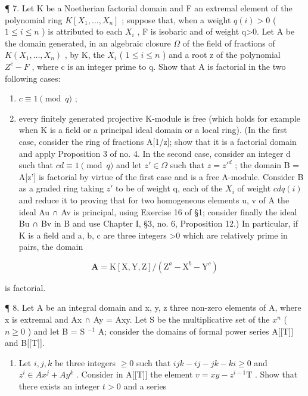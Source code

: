 ¶ 7. Let K be a Noetherian factorial domain and F an extremal element of the polynomial ring \(K[X_{1},\ldots,X_{n}]\) ; suppose that, when a weight \(q(i)>0\) ( \(1\leqslant i\leqslant n\) ) is attributed to each \(X_{i}\) , F is isobaric and of weight q\textgreater0. Let A be the domain generated, in an algebraic closure \(\Omega\) of the field of fractions of \(K(X_{1},\ldots,X_{n})\) , by K, the \(X_{i}\) ( \(1\leqslant i\leqslant n\) ) and a root z of the polynomial \(Z^{c}-F\) , where c is an integer prime to q. Show that A is factorial in the two following cases:

\begin{enumerate}
\def\labelenumi{(\arabic{enumi})}
\item
  \(c \equiv 1 \pmod{q}\) ;
\item
  every finitely generated projective K-module is free (which holds for example when K is a field or a principal ideal domain or a local ring). (In the first case, consider the ring of fractions A{[}1/z{]}; show that it is a factorial domain and apply Proposition 3 of no. 4. In the second case, consider an integer d such that \(cd \equiv 1 \pmod{q}\) and let \(z' \in \Omega\) such that \(z = z'^{d}\) ; the domain B = A{[}z'{]} is factorial by virtue of the first case and is a free A-module. Consider B as a graded ring taking \(z'\) to be of weight q, each of the \(X_{i}\) of weight \(cdq(i)\) and reduce it to proving that for two homogeneous elements u, v of A the ideal Au ∩ Av is principal, using Exercise 16 of §1; consider finally the ideal Bu ∩ Bv in B and use Chapter I, §3, no. 6, Proposition 12.) In particular, if K is a field and a, b, c are three integers \textgreater0 which are relatively prime in pairs, the domain
\end{enumerate}

\[
\mathbf {A} = \mathrm{K} [ \mathrm{X}, \mathrm{Y}, \mathrm{Z} ] / (\mathrm{Z} ^ {a} - \mathrm{X} ^ {b} - \mathrm{Y} ^ {c})
\]

is factorial.

¶ 8. Let A be an integral domain and x, y, z three non-zero elements of A, where x is extremal and Ax ∩ Ay = Axy. Let S be the multiplicative set of the \(x^{n}\) ( \(n \geqslant 0\) ) and let B = S \(^{-1}\) A; consider the domains of formal power series A{[}{[}T{]}{]} and B{[}{[}T{]}{]}.

\begin{enumerate}
\def\labelenumi{(\alph{enumi})}
\tightlist
\item
  Let \(i, j, k\) be three integers \(\geqslant 0\) such that \(ijk - ij - jk - ki \geqslant 0\) and \(z^i \in Ax^j + Ay^k\) . Consider in A{[}{[}T{]}{]} the element \(v = xy - z^{i-1}\mathrm{T}\) . Show that there exists an integer \(t > 0\) and a series
\end{enumerate}

